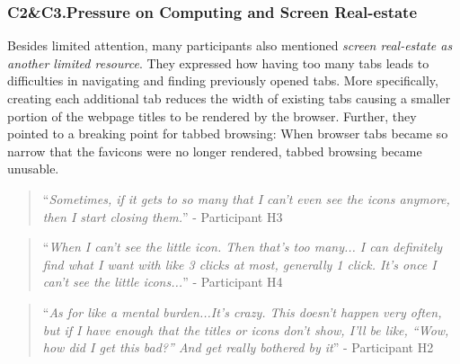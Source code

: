 \subsubsection{C2\&C3.Pressure on Computing and Screen Real-estate}

Besides limited attention, many participants also mentioned \emph{screen real-estate as another limited resource}. They expressed how having too many tabs leads to difficulties in navigating and finding previously opened tabs. More specifically, creating each additional tab reduces the width of existing tabs causing a smaller portion of the webpage titles to be rendered by the browser. Further, they pointed to a breaking point for tabbed browsing: When browser tabs became so narrow that the favicons were no longer rendered, tabbed browsing became unusable. 


\begin{quote}
``\emph{Sometimes, if it gets to so many that I can't even see the icons anymore, then I start closing them.}'' - Participant H3
\end{quote}


\begin{quote}
``\emph{When I can't see the little icon. Then that's too many... I can definitely find what I want with like 3 clicks at most, generally 1 click. It's once I can't see the little icons...}'' - Participant H4
\end{quote}

\begin{quote}
``\emph{As for like a mental burden...It's crazy. This doesn't happen very often, but if I have enough that the titles or icons don't show, I'll be like, ``Wow, how did I get this bad?'' And get really bothered by it}'' -  Participant H2
\end{quote}

